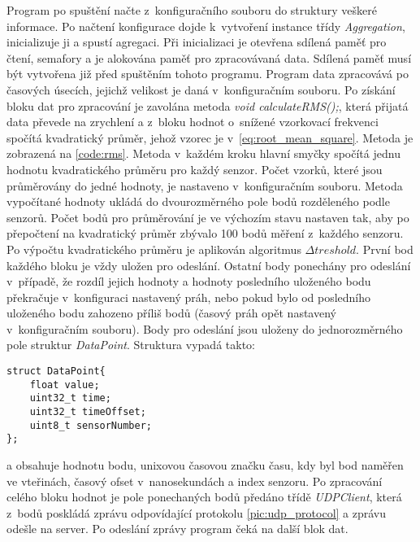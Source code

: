 Program po spuštění načte z~konfiguračního souboru do struktury veškeré informace. Po načtení konfigurace dojde k~vytvoření instance třídy \textit{Aggregation}, inicializuje ji a spustí agregaci. Při inicializaci je otevřena sdílená paměť pro čtení, semafory a je alokována paměť pro zpracovávaná data. Sdílená paměť musí být vytvořena již před spuštěním tohoto programu. Program data zpracovává po časových úsecích, jejichž velikost je daná v~konfiguračním souboru. Po získání bloku dat pro zpracování je zavolána metoda \textit{void calculateRMS();}, která přijatá data převede na zrychlení a z~bloku hodnot o~snížené vzorkovací frekvenci spočítá kvadratický průměr, jehož vzorec je v~\ref{eq:root_mean_square}. Metoda je zobrazená na \ref{code:rms}. Metoda v~každém kroku hlavní smyčky spočítá jednu hodnotu kvadratického průměru pro každý senzor. Počet vzorků, které jsou průměrovány do jedné hodnoty, je nastaveno v~konfiguračním souboru. Metoda vypočítané hodnoty ukládá do dvourozměrného pole bodů rozděleného podle senzorů. Počet bodů pro průměrování je ve výchozím stavu nastaven tak, aby po přepočtení na kvadratický průměr zbývalo 100 bodů měření z~každého senzoru. Po výpočtu kvadratického průměru je aplikován algoritmus $\Delta treshold$. První bod každého bloku je vždy uložen pro odeslání. Ostatní body ponechány pro odeslání v~případě, že rozdíl jejich hodnoty a hodnoty posledního uloženého bodu překračuje v~konfiguraci nastavený práh, nebo pokud bylo od posledního uloženého bodu zahozeno příliš bodů (časový práh opět nastavený v~konfiguračním souboru). Body pro odeslání jsou uloženy do jednorozměrného pole struktur \textit{DataPoint}. Struktura vypadá takto:
\begin{lstlisting}[style=c++, breaklines]
struct DataPoint{
    float value;
    uint32_t time;
    uint32_t timeOffset;
    uint8_t sensorNumber;
};
\end{lstlisting}
a obsahuje hodnotu bodu, unixovou časovou značku času, kdy byl bod naměřen ve vteřinách, časový ofset v~nanosekundách a index senzoru. Po zpracování celého bloku hodnot je pole ponechaných bodů předáno třídě \textit{UDPClient}, která z~bodů poskládá zprávu odpovídající protokolu \ref{pic:udp_protocol} a zprávu odešle na server. Po odeslání zprávy program čeká na další blok dat.


